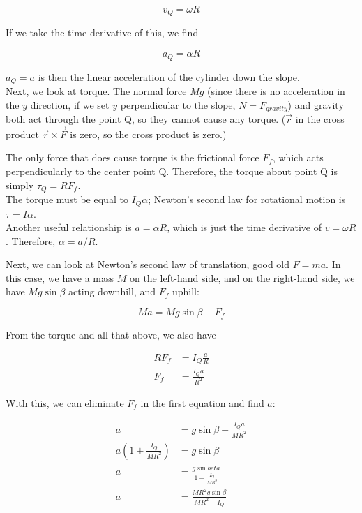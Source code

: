 \documentclass[8.01x]{subfiles}
\begin{document}
\begin{equation}
v_Q = \omega R
\end{equation}

If we take the time derivative of this, we find

\begin{equation}
a_Q = \alpha R
\end{equation}

$a_Q = a$ is then the linear acceleration of the cylinder down the slope.\\
Next, we look at torque. The normal force $M g$ (since there is no acceleration in the $y$ direction, if we set $y$ perpendicular to the slope, $N = F_{gravity}$) and gravity both act through the point Q, so they cannot cause any torque. ($\vec{r}$ in the cross product $\vec{r} \times \vec{F}$ is zero, so the cross product is zero.)

The only force that does cause torque is the frictional force $F_f$, which acts perpendicularly to the center point Q. Therefore, the torque about point Q is simply $\tau_Q = R F_f$.\\
The torque must be equal to $I_Q \alpha$; Newton's second law for rotational motion is $\tau = I \alpha$.\\
Another useful relationship is $a = \alpha R$, which is just the time derivative of $v = \omega R$. Therefore, $\alpha = a/R$.

Next, we can look at Newton's second law of translation, good old $F = m a$. In this case, we have a mass $M$ on the left-hand side, and on the right-hand side, we have $M g \sin \beta$ acting downhill, and $F_f$ uphill:

\begin{equation}
M a = M g \sin \beta - F_f
\end{equation}

From the torque and all that above, we also have

\begin{align}
R F_f &= I_Q \frac{a}{R}\\
F_f &= \frac{I_Q a}{R^2}
\end{align}

With this, we can eliminate $F_f$ in the first equation and find $a$:

\begin{align}
a &= g \sin \beta - \frac{I_Q a}{M R^2}\\
a \left(1 + \frac{I_Q}{M R^2}\right) &= g \sin \beta\\
a &= \frac{g \sin beta}{1 + \frac{I_Q}{M R^2}}\\
a &= \frac{M R^2 g \sin \beta}{M R^2 + I_Q}
\end{align}
\end{document}

